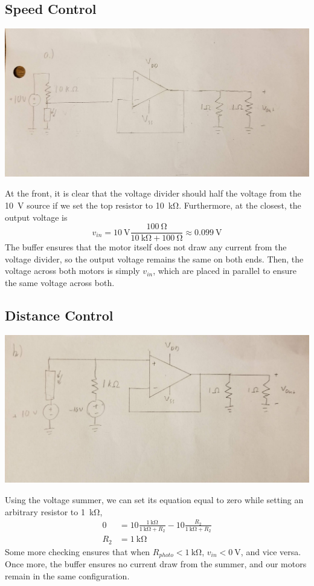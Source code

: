 \documentclass[]{article}
\begin{document}
\subsection{Speed Control}

\begin{center}
	\includegraphics[width=0.7\linewidth]{20191115_175023}
\end{center}

At the front, it is clear that the voltage divider should half the voltage from the \SI{10}{\volt} source if we set the top resistor to \SI{10}{\kilo\ohm}. 
Furthermore, at the closest, the output voltage is 
\begin{equation}
	v_{in} = \SI{10}{\volt} \frac{\SI{100}{\ohm}}{\SI{10}{\kilo\ohm} + \SI{100}{\ohm}} \approx \SI{0.099}{\volt}
\end{equation}
The buffer ensures that the motor itself does not draw any current from the voltage divider, so the output voltage remains the same on both ends. 
Then, the voltage across both motors is simply \(v_{in}\), which are placed in parallel to ensure the same voltage across both. 

\subsection{Distance Control}

\begin{center}
	\includegraphics[width=0.7\linewidth]{20191115_175034}
\end{center}

Using the voltage summer, we can set its equation equal to zero while setting an arbitrary resistor to \SI{1}{\kilo\ohm}, 
\begin{align}
	0 &= 10 \frac{\SI{1}{\kilo\ohm}}{\SI{1}{\kilo\ohm} + R_2} - 10 \frac{R_2}{\SI{1}{\kilo\ohm} + R_2} \\
	R_2 &= \SI{1}{\kilo\ohm}
\end{align}
Some more checking ensures that when \(R_{photo} < \SI{1}{\kilo\ohm}\), \(v_{in} < \SI{0}{\volt}\), and vice versa. 
Once more, the buffer ensures no current draw from the summer, and our motors remain in the same configuration. 
\end{document}
